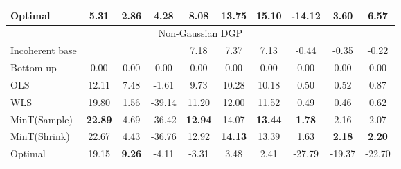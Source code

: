 \documentclass[12pt]{article}
\def\mathbi#1{\textit{ #1}}
\theoremstyle{definition}
\begin{document}
\begin{table}[H]
{\begin{tabular}{lccccccccc}
			Optimal & 5.31 & \textbf{2.86} &\textbf{ 4.28} & 8.08 & 13.75 & \textbf{15.10} & -14.12 & 3.60 & 6.57\\
			\toprule
			\multicolumn{10}{c}{Non-Gaussian DGP}\\
			\toprule
			Incoherent base & & & & 7.18 & 7.37 & 7.13 & -0.44 & -0.35 & -0.22\\
			Bottom-up & 0.00 & 0.00 & 0.00 & 0.00 & 0.00 & 0.00 & 0.00 & 0.00 & 0.00\\
			OLS & 12.11 & 7.48 & -1.61 & 9.73 & 10.28 & 10.18 & 0.50 & 0.52 & 0.87\\
			WLS & 19.80 & 1.56 & -39.14 & 11.20 & 12.00 & 11.52 & 0.49 & 0.46 & 0.62\\
			MinT(Sample) & \textbf{22.89} & 4.69 & -36.42 & \textbf{12.94} & 14.07 & \textbf{13.44} & \textbf{1.78} & 2.16 & 2.07\\
			MinT(Shrink) & 22.67 & 4.43 & -36.76 & 12.92 & \textbf{14.13} & 13.39 & 1.63 & \textbf{2.18} & \textbf{2.20}\\
			Optimal & 19.15 & \textbf{9.26} & -4.11 & -3.31 & 3.48 & 2.41 & -27.79 & -19.37 & -22.70\\
			\bottomrule
		\end{tabular}
	}
\end{table}
\end{document}
